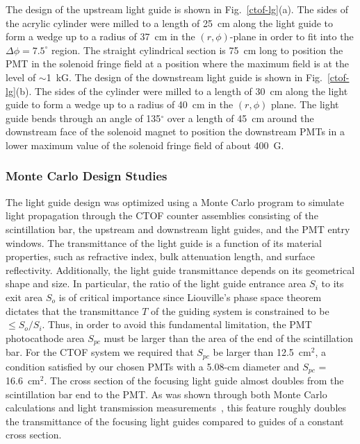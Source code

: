 \documentclass[3p,times,twocolumn]{elsarticle}
\begin{document}
The design of the upstream light guide is shown in Fig.~\ref{ctof-lg}(a). The sides of the acrylic
cylinder were milled to a length of 25~cm along the light guide to form a wedge up to a radius of 37~cm
in the $(r,\phi)$-plane in order to fit into the $\Delta \phi=7.5^\circ$ region. The straight cylindrical
section is 75~cm long to position the PMT in the solenoid fringe field at a position where the maximum
field is at the level of $\sim$1~kG. The design of the downstream light guide is shown in
Fig.~\ref{ctof-lg}(b). The sides of the cylinder were milled to a length of 30~cm along the light guide to
form a wedge up to a radius of 40~cm in the $(r,\phi)$ plane. The light guide bends through an angle of
135$^\circ$ over a length of 45~cm around the downstream face of the solenoid magnet to position the
downstream PMTs in a lower maximum value of the solenoid fringe field of about 400~G. 
 
\subsubsection{Monte Carlo Design Studies}
\label{lg-mc}

The light guide design was optimized using a Monte Carlo program to simulate light propagation through the
CTOF counter assemblies consisting of the scintillation bar, the upstream and downstream light guides, and
the PMT entry windows. The transmittance of the light guide is a function of its material properties, such as
refractive index, bulk attenuation length, and surface reflectivity. Additionally, the light guide transmittance
depends on its geometrical shape and size. In particular, the ratio of the light guide entrance area $S_i$ to
its exit area $S_o$ is of critical importance since Liouville's phase space theorem dictates that the 
transmittance $T$ of the guiding system is constrained to be $\le S_o/S_i$. Thus, in order to avoid this
fundamental limitation, the PMT photocathode area $S_{pc}$ must be larger than the area of the end of the
scintillation bar. For the CTOF system we required that $S_{pc}$ be larger than 12.5~cm$^2$, a condition
satisfied by our chosen PMTs with a 5.08-cm diameter and $S_{pc}$ = 16.6~cm$^2$. The cross section of the
focusing light guide almost doubles from the scintillation bar end to the PMT. As was shown through both
Monte Carlo calculations and light transmission measurements~\cite{barbosa06}, this feature roughly doubles
the transmittance of the focusing light guides compared to guides of a constant cross section.
\end{document}
